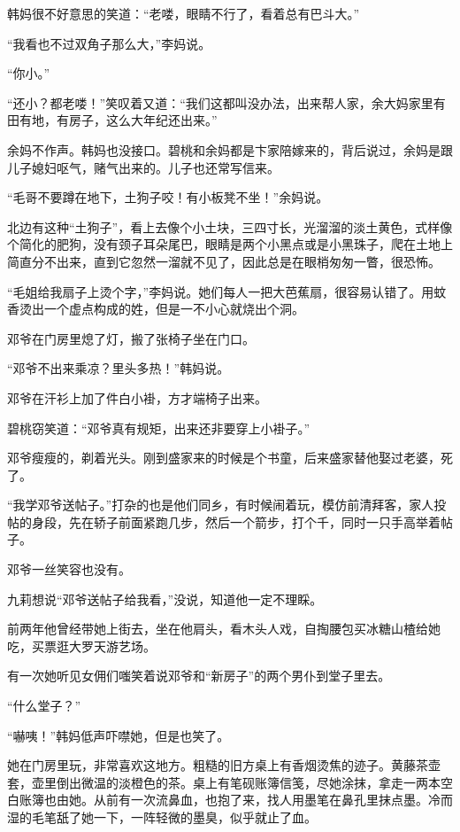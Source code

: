 \par 韩妈很不好意思的笑道：“老喽，眼睛不行了，看着总有巴斗大。”
\par “我看也不过双角子那么大，”李妈说。
\par “你小。”
\par “还小？都老喽！”笑叹着又道：“我们这都叫没办法，出来帮人家，余大妈家里有田有地，有房子，这么大年纪还出来。”
\par 余妈不作声。韩妈也没接口。碧桃和余妈都是卞家陪嫁来的，背后说过，余妈是跟儿子媳妇呕气，赌气出来的。儿子也还常写信来。
\par “毛哥不要蹲在地下，土狗子咬！有小板凳不坐！”余妈说。
\par 北边有这种“土狗子”，看上去像个小土块，三四寸长，光溜溜的淡土黄色，式样像个简化的肥狗，没有颈子耳朵尾巴，眼睛是两个小黑点或是小黑珠子，爬在土地上简直分不出来，直到它忽然一溜就不见了，因此总是在眼梢匆匆一瞥，很恐怖。
\par “毛姐给我扇子上烫个字，”李妈说。她们每人一把大芭蕉扇，很容易认错了。用蚊香烫出一个虚点构成的姓，但是一不小心就烧出个洞。
\par 邓爷在门房里熄了灯，搬了张椅子坐在门口。
\par “邓爷不出来乘凉？里头多热！”韩妈说。
\par 邓爷在汗衫上加了件白小褂，方才端椅子出来。
\par 碧桃窃笑道：“邓爷真有规矩，出来还非要穿上小褂子。”
\par 邓爷瘦瘦的，剃着光头。刚到盛家来的时候是个书童，后来盛家替他娶过老婆，死了。
\par “我学邓爷送帖子。”打杂的也是他们同乡，有时候闹着玩，模仿前清拜客，家人投帖的身段，先在轿子前面紧跑几步，然后一个箭步，打个千，同时一只手高举着帖子。
\par 邓爷一丝笑容也没有。
\par 九莉想说“邓爷送帖子给我看，”没说，知道他一定不理睬。
\par 前两年他曾经带她上街去，坐在他肩头，看木头人戏，自掏腰包买冰糖山楂给她吃，买票逛大罗天游艺场。
\par 有一次她听见女佣们嗤笑着说邓爷和“新房子”的两个男仆到堂子里去。
\par “什么堂子？”
\par “嚇咦！”韩妈低声吓噤她，但是也笑了。
\par 她在门房里玩，非常喜欢这地方。粗糙的旧方桌上有香烟烫焦的迹子。黄藤茶壶套，壶里倒出微温的淡橙色的茶。桌上有笔砚账簿信笺，尽她涂抹，拿走一两本空白账簿也由她。从前有一次流鼻血，也抱了来，找人用墨笔在鼻孔里抹点墨。冷而湿的毛笔舐了她一下，一阵轻微的墨臭，似乎就止了血。

